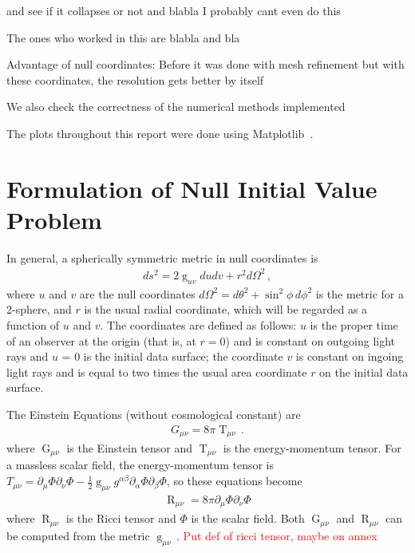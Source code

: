 \documentclass[11pt]{article}
\DeclareMathOperator{\g}{g}
\DeclareMathOperator{\G}{G}
\DeclareMathOperator{\T}{T}
\DeclareMathOperator{\R}{R}
\begin{document}
and see if it collapses or not and blabla I probably cant even do this

The ones who worked in this are blabla and bla

Advantage of null coordinates: Before it was done with mesh refinement but with these coordinates, the resolution gets better by itself

We also check the correctness of the numerical methods implemented

The plots throughout this report were done using Matplotlib~\cite{Matplotlib}.

\section{Formulation of Null Initial Value Problem}\label{sec: Formulation}

In general, a spherically symmetric metric in null coordinates is
\begin{align}
    ds^2 = 2\g_{uv}dudv + r^2d\Omega^2\, , \label{eq: double null metric}
\end{align}
where $u$ and $v$ are the null coordinates $d\Omega^2 = d\theta^2+\sin^2\phi\,d\phi^2$ is the metric for a 2-sphere, and $r$ is the usual radial coordinate, which will be regarded as a function of $u$ and $v$. The coordinates are defined as follows: $u$ is the proper time of an observer at the origin (that is, at $r=0$) and is constant on outgoing light rays and $u$ = 0 is the initial data surface; the coordinate $v$ is constant on ingoing light rays and is equal to two times the usual area coordinate $r$ on the initial data surface.

The Einstein Equations (without cosmological constant) are
\begin{gather}
    G_{\mu\nu}=8\pi\T_{\mu\nu} \, .
\end{gather}
where $\G_{\mu\nu}$ is the Einstein tensor and $\T_{\mu\nu}$ is the energy-momentum tensor.
For a massless scalar field, the energy-momentum tensor is $T_{\mu\nu}=\partial_\mu\Phi\partial_\nu\Phi-\frac{1}{2}\g_{\mu\nu}g^{\alpha\beta}\partial_\alpha\Phi\partial_\beta\Phi $, so these equations become
\begin{align}
    \R_{\mu\nu}=8\pi\partial_\mu\Phi\partial_\nu\Phi 
    \label{eq: Einstein eqs}
\end{align}
where $\R_{\mu\nu}$ is the Ricci tensor and $\Phi$ is the scalar field. Both $\G_{\mu\nu}$ and $\R_{\mu\nu}$ can be computed from the metric $\g_{\mu\nu}\,$. \textcolor{red}{Put def of ricci tensor, maybe on annex}
\end{document}
